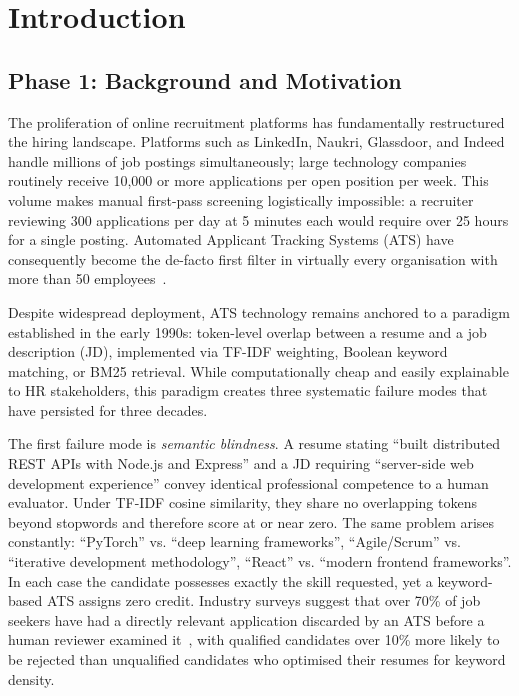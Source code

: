 \documentclass[conference]{IEEEtran}
\begin{document}
\section{Introduction}

\subsection{Phase 1: Background and Motivation}

The proliferation of online recruitment platforms has fundamentally
restructured the hiring landscape. Platforms such as LinkedIn, Naukri,
Glassdoor, and Indeed handle millions of job postings simultaneously;
large technology companies routinely receive 10,000 or more applications
per open position per week. This volume makes manual first-pass screening
logistically impossible: a recruiter reviewing 300 applications per day
at 5 minutes each would require over 25 hours for a single posting.
Automated Applicant Tracking Systems (ATS) have consequently become the
de-facto first filter in virtually every organisation with more than
50 employees~\cite{lavi2021consultantbert}.

Despite widespread deployment, ATS technology remains anchored to a paradigm
established in the early 1990s: token-level overlap between a resume and a
job description (JD), implemented via TF-IDF weighting, Boolean keyword
matching, or BM25 retrieval. While computationally cheap and easily
explainable to HR stakeholders, this paradigm creates three systematic
failure modes that have persisted for three decades.

The first failure mode is \textit{semantic blindness}. A resume stating
``built distributed REST APIs with Node.js and Express'' and a JD requiring
``server-side web development experience'' convey identical professional
competence to a human evaluator. Under TF-IDF cosine similarity, they share
no overlapping tokens beyond stopwords and therefore score at or near zero.
The same problem arises constantly: ``PyTorch'' vs. ``deep learning
frameworks'', ``Agile/Scrum'' vs. ``iterative development methodology'',
``React'' vs. ``modern frontend frameworks''. In each case the candidate
possesses exactly the skill requested, yet a keyword-based ATS assigns zero
credit. Industry surveys suggest that over 70\% of job seekers have had a
directly relevant application discarded by an ATS before a human reviewer
examined it~\cite{lavi2021consultantbert}, with qualified candidates over
10\% more likely to be rejected than unqualified candidates who optimised
their resumes for keyword density.
\end{document}
